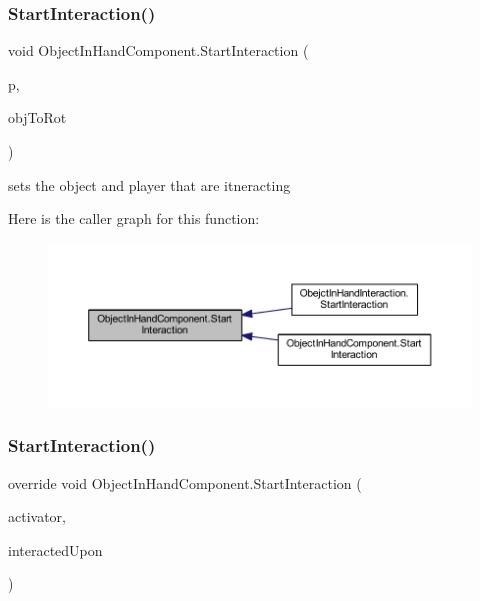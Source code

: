 \subsubsection{\texorpdfstring{Start\+Interaction()}{StartInteraction()}\hspace{0.1cm}{\footnotesize\ttfamily [1/2]}}
{\footnotesize\ttfamily void Object\+In\+Hand\+Component.\+Start\+Interaction (\begin{DoxyParamCaption}\item[{\mbox{\hyperlink{class_player}{Player}}}]{p,  }\item[{Transform}]{obj\+To\+Rot }\end{DoxyParamCaption})}



sets the object and player that are itneracting 

Here is the caller graph for this function\+:
\nopagebreak
\begin{figure}[H]
\begin{center}
\leavevmode
\includegraphics[width=350pt]{class_object_in_hand_component_a3399bcee7bffea9b599f1dd8d6e2a93c_icgraph}
\end{center}
\end{figure}
\mbox{\label{class_object_in_hand_component_aed115a3a0f70c23370cab4428454025c}} 
\subsubsection{\texorpdfstring{Start\+Interaction()}{StartInteraction()}\hspace{0.1cm}{\footnotesize\ttfamily [2/2]}}
{\footnotesize\ttfamily override void Object\+In\+Hand\+Component.\+Start\+Interaction (\begin{DoxyParamCaption}\item[{Game\+Object}]{activator,  }\item[{Game\+Object}]{interacted\+Upon }\end{DoxyParamCaption})\hspace{0.3cm}{\ttfamily [virtual]}}



